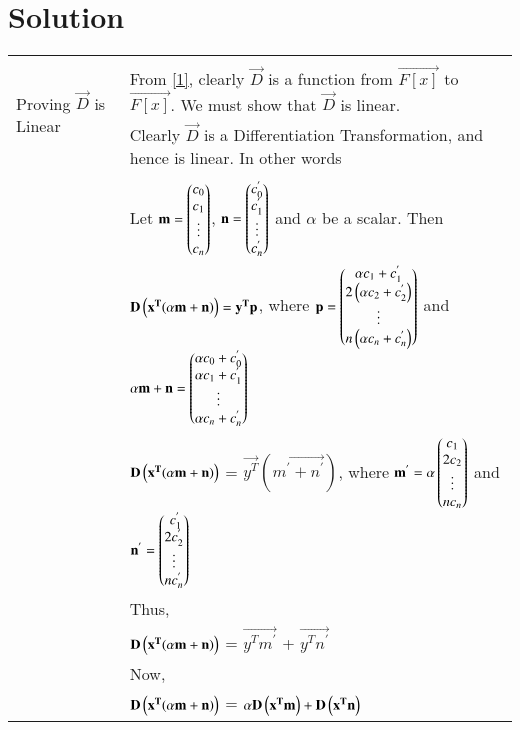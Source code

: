 \documentclass[journal,12pt,twocolumn]{IEEEtran}
\begin{document}
\section{Solution}
\begin{table}[hp]
	\begin{tabular}{|l|l|}
		\hline
		\multirow{3}{*}{Proving $\vec{D}$ is Linear} & \\
		& From \eqref{1}, clearly $\vec{D}$ is a function from $\vec{F[x]}$ to $\vec{F[x]}$. We must show that $\vec{D}$ is linear.\\
		& Clearly $\vec{D}$ is a Differentiation Transformation, and hence is linear. In other words \\
		& \\
		& Let $\mathbf{m} = \begin{pmatrix}c_0 \\ c_1 \\ \vdots \\c_n\end{pmatrix}$, $\mathbf{n} = \begin{pmatrix}c_0^{'} \\ c_1^{'} \\ \vdots \\ c_n^{'}\end{pmatrix}$ and $\alpha$ be a scalar. Then\\
		& \qquad \qquad  $\mathbf{D}\left(\mathbf{x^T(\alpha m + n)}\right) = \mathbf{y^{T}p}$, where $\mathbf{p} = \begin{pmatrix}\alpha c_1 + c_1 ^{'} \\ 2\left(\alpha c_2 + c_2 ^{'}\right) \\ \vdots \\ n\left(\alpha c_n + c_n ^{'}\right)\end{pmatrix}$  and $\mathbf{\alpha m + n} = \begin{pmatrix}\alpha c_0 + c_0^{'} \\ \alpha c_1 + c_1^{'} \\ \vdots \\ \alpha c_n + c_n^{'} \end{pmatrix}$\\
		& \qquad \qquad  $\mathbf{D}\left(\mathbf{x^T(\alpha m + n)}\right)$ = $\vec{y^{T}}(\vec{m^{'} + n^{'}})$, where $\mathbf{m^{'}} = \alpha\begin{pmatrix}c_1 \\ 2c_2 \\ \vdots \\ nc_n\end{pmatrix}$ and $\mathbf{n^{'}} = \begin{pmatrix}\ c_1^{'} \\ 2c_2^{'} \\ \vdots \\ nc_n^{'}\end{pmatrix}$\\
		& Thus,\\
		& \qquad \qquad $\mathbf{D}\left(\mathbf{x^T(\alpha m + n)}\right)$ = $\vec{y^{T}m^{'}}$ + $\vec{y^{T}n^{'}}$ \\
        & Now,\\	
		& \qquad \qquad $\mathbf{D}\left(\mathbf{x^T(\alpha m + n)}\right)$ = $\alpha\mathbf{D}\left(\mathbf{x^{T}m}\right) + \mathbf{D}\left(\mathbf{x^{T}n}\right) $\\

\end{tabular}
\end{table}
\end{document}
